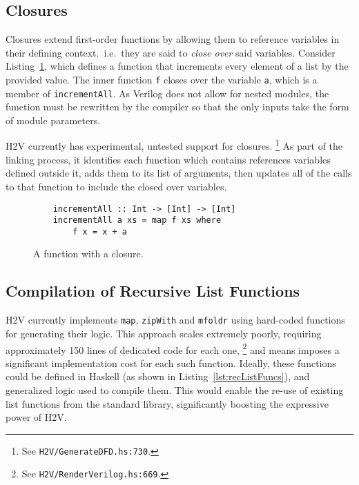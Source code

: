 \documentclass[english,onecolumn]{scrartcl}
\begin{document}
\subsection{Closures}
Closures extend first-order functions by allowing them to reference variables in their defining context.\ i.e.\ they are said to
\textit{close over} said variables. Consider Listing~\ref{lst:closure}, which defines a function that increments every element of
a list by the provided value. The inner function \texttt{f} closes over the variable \texttt{a}, which is a member of
\texttt{incrementAll}. As Verilog does not allow for nested modules, the function must be rewritten by the compiler so that the
only inputs take the form of module parameters.

H2V currently has experimental, untested support for closures.%
\footnote{See \texttt{H2V/GenerateDFD.hs:730}.}
As part of the linking process, it identifies each function which contains references variables defined outside it,
adds them to its list of arguments, then updates all of the calls to that function to include the closed over variables.

\begin{figure}
\begin{lstlisting}
    incrementAll :: Int -> [Int] -> [Int]
    incrementAll a xs = map f xs where
        f x = x + a
\end{lstlisting}
\caption{A function with a closure.\label{lst:closure}}
\end{figure}


\subsection{Compilation of Recursive List Functions}
\label{sec:parListComp}
H2V currently implements \texttt{map}, \texttt{zipWith} and \texttt{mfoldr} using hard-coded functions for generating their logic.
This approach scales extremely poorly, requiring approximately 150 lines of dedicated code for each one,%
\footnote{See \texttt{H2V/RenderVerilog.hs:669}.}
and means imposes a significant implementation cost for each such function. Ideally, these functions could be defined in Haskell
(as shown in Listing~\ref{lst:recListFuncs}), and generalized logic used to compile them.
This would enable the re-use of existing list functions from the standard library, significantly boosting the expressive power of H2V.
\end{document}
